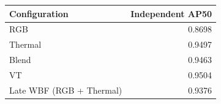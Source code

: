 \begin{tabular}{lr}
\toprule
Configuration & Independent AP50 \\
\midrule
RGB & 0.8698 \\
Thermal & 0.9497 \\
Blend & 0.9463 \\
VT & 0.9504 \\
Late WBF (RGB + Thermal) & 0.9376 \\
\bottomrule
\end{tabular}
